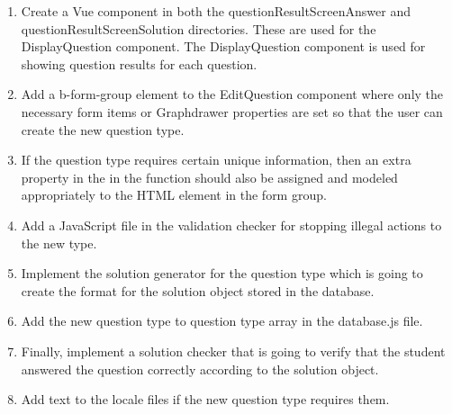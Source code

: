 \begin{enumerate}
    \item Create a Vue component in both the questionResultScreenAnswer and questionResultScreenSolution directories. These are used for the DisplayQuestion component. The DisplayQuestion component is used for showing question results for each question.
    \item Add a b-form-group element to the EditQuestion component where only the necessary form items or Graphdrawer properties are set so that the user can create the new question type.
    \item If the question type requires certain unique information, then an extra property in the  in the  function should also be assigned and modeled appropriately to the HTML element in the form group.
    \item Add a JavaScript file in the validation checker for stopping illegal actions to the new type. 
    \item Implement the solution generator for the question type which is going to create the format for the solution object stored in the database.
    \item Add the new question type to question type array in the database.js file.
    \item Finally, implement a solution checker that is going to verify that the student answered the question correctly according to the solution object. 
    \item Add text to the locale files if the new question type requires them.
\end{enumerate}
